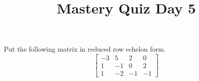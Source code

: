 \documentclass{sbgquiz}
\title{Mastery Quiz Day 5 }
\begin{document}
\begin{problem}[E2]
Put the following matrix in reduced row echelon form.
$$\begin{bmatrix}
-3 & 5 & 2 & 0 \\
 1 & -1 & 0 & 2 \\
 1 & -2 & -1 & -1 
\end{bmatrix}$$
\end{problem}
\end{document}

